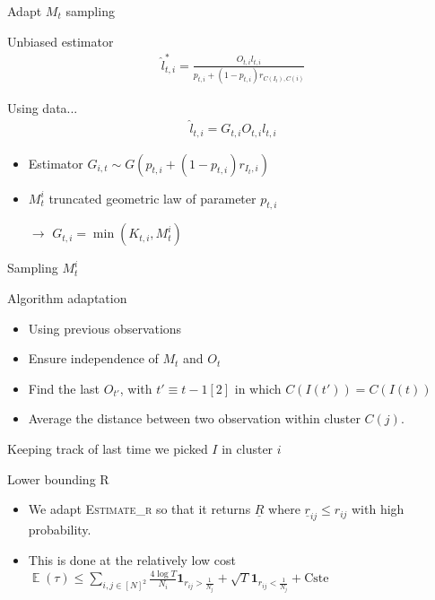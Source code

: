 \documentclass[11pt]{beamer}
\DeclareMathOperator*{\expect}{\mathbb{E}}
\begin{document}
\begin{frame}{Adapt $M_t$ sampling}
\begin{block}{Unbiased estimator}
\begin{align*}
\hat{l}_{t,i}^{*} = \frac{O_{t,i}l_{t,i}}{p_{t,i}+(1-p_{t,i})r_{C(I_t),C(i)}}
\end{align*}
\end{block}
\begin{block}{Using data...}
\begin{align}
\hat{l}_{t,i}=G_{t,i}O_{t,i}l_{t,i}
\end{align}
\begin{itemize}
\item Estimator $G_{i,t} \sim G(p_{t,i}+(1-p_{t,i})r_{I_t,i})$
\item $M_t^i$ truncated geometric law of parameter $p_{t,i}$
\item[$\rightarrow$] $G_{t,i}=\min\left(K_{t,i},M_t^i\right)$
\end{itemize}
\end{block}
\end{frame}

\begin{frame}{Sampling $M_t^i$}

\begin{block}{Algorithm adaptation}
\begin{itemize}
\item Using previous observations
\item Ensure independence of $M_t$ and $O_t$
\item Find the last $O_{t'}$, with $t' \equiv t -1 [2]$ in which $C(I(t')) = C(I(t))$
\item Average the distance between two observation within cluster $C(j)$.
\end{itemize}
\end{block}

\alert{Keeping track of last time we picked $I$ in cluster $i$}

\end{frame}


\begin{frame}{Lower bounding R}
\begin{itemize}
\item We adapt \textsc{Estimate\_r} so that it returns $\underline{R}$ where $\underline{r}_{ij} \leq r_{ij}$ with high probability.
\item This is done at the relatively low cost $\expect\left({\tau}\right) \leq \sum_{i,j \in [N]^2} \frac{4\log T}{N_i} \mathbf{1}_{r_{ij} > \frac{1}{N_j}} + \sqrt{T} \mathbf{1}_{r_{ij} < \frac{1}{N_j}}+ \mathrm{Cste}$
\end{itemize}
\end{frame}
\end{document}
